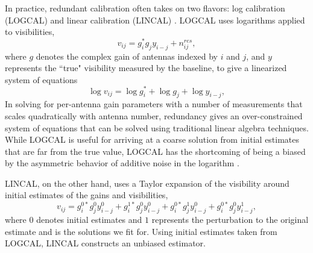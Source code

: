 \documentclass[twocolumn,numberedappendix]{emulateapj} \shorttitle{New Limits on the 21 cm Power Spectrum at $z=8.4$}
\begin{document}

In practice, redundant calibration often takes on two flavors: log calibration (LOGCAL) and
linear calibration (LINCAL) \citep{liu_et_al2010,zheng_et_al2014}. LOGCAL uses 
logarithms applied to visibilities, 
\begin{equation}
    v_{ij} = g_{i}^{\ast}g_{j}y_{i-j} + n_{ij}^{res},
\end{equation}
where $g$ denotes the complex gain of antennas indexed by $i$ and $j$, and $y$
represents the ``true" visibility measured by the baseline, to give
a linearized system of equations
\begin{equation}\label{eqn:logcal}
    \log{v_{ij}} = \log{g_{i}^{*}} + \log{g_{j}} + \log{y_{i-j}},
\end{equation}
In solving for per-antenna gain parameters with
a number of measurements that scales quadratically with antenna number, redundancy gives 
an over-constrained
system of equations that can be solved
using traditional linear algebra techniques.
While LOGCAL is useful for arriving at a coarse solution from initial estimates that are far
from the true value, LOGCAL has the shortcoming of being a biased by the asymmetric behavior
of additive noise in the logarithm \citep{liu_et_al2010}.

LINCAL, on the other hand, uses a Taylor expansion of the visibility around initial
estimates of the gains and visibilities, 
\begin{equation}\label{eqn:lincal}
v_{ij} = g_{i}^{0*}g_{j}^{0}y_{i-j}^{0} + g_{i}^{1*}g_{j}^{0}y_{i-j}^{0} +
         g_{i}^{0*}g_{j}^{1}y_{i-j}^{0}+g_{i}^{0*}g_{j}^{0}y_{i-j}^{1},
\end{equation}
where $0$ denotes initial estimates and $1$ represents the perturbation to the
original estimate and is the solutions we fit for.  Using initial estimates
taken from LOGCAL, LINCAL constructs an unbiased estimator.
\end{document}

